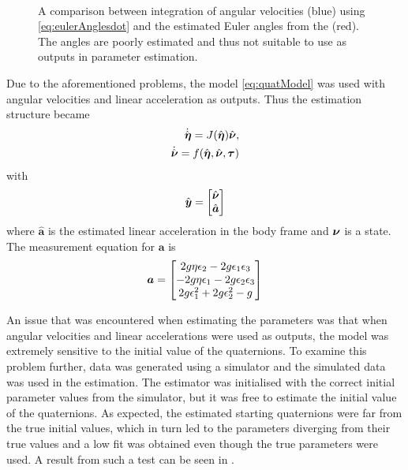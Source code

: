 \begin{figure}[htbp]
  \centering
  \qquad
  \\
  \caption{\label{fig:integratedAngleVelocities}%
  A comparison between integration of angular velocities (blue) using \eqref{eq:eulerAnglesdot} and the estimated Euler angles from the \abbrEKF (red). The angles are poorly estimated and thus not suitable to use as outputs in parameter estimation.}
\end{figure}
Due to the aforementioned problems, the model \eqref{eq:quatModel} was used with angular velocities and linear acceleration as outputs. Thus the estimation structure became
\begin{align}
\dot{\hat{\boldsymbol{\eta}}} = J(\hat{\boldsymbol{\eta}}) \hat{\boldsymbol{\nu}},\\
\dot{\hat{\boldsymbol{\nu}}} =  f(\hat{\boldsymbol{\eta}}, \hat{\boldsymbol{\nu}}, \boldsymbol{\tau})
\end{align}
with 
\begin{equation}
\hat{\boldsymbol{y}} = \begin{bmatrix}
\hat{\boldsymbol{\nu}} \\
\hat{\boldsymbol{a}}
\end{bmatrix}
\end{equation}
where $\hat{\boldsymbol{a}}$ is the estimated linear acceleration in the body frame and $\boldsymbol{\nu}$ is a state. The measurement equation for $\boldsymbol{a}$ is
\begin{equation}
\boldsymbol{a} = \begin{bmatrix}
    2 g \eta \epsilon_2 -2 g \epsilon_1 \epsilon_3 \\
    -2 g \eta \epsilon_1 -2g \epsilon_2 \epsilon_3 \\
    2g \epsilon_1^2 + 2 g \epsilon_2^2 - g 
    \end{bmatrix}
\end{equation} 

An issue that was encountered when estimating the parameters was that when angular velocities and linear accelerations were used as outputs, the model was extremely sensitive to the initial value of the quaternions. To examine this problem further, data was generated using a simulator and the simulated data was used in the estimation. The estimator was initialised with the correct initial parameter values from the simulator, but it was free to estimate the initial value of the quaternions. As expected, the estimated starting quaternions were far from the true initial values, which in turn led to the parameters diverging from their true values and a low fit was obtained even though the true parameters were used. A result from such a test can be seen in .

